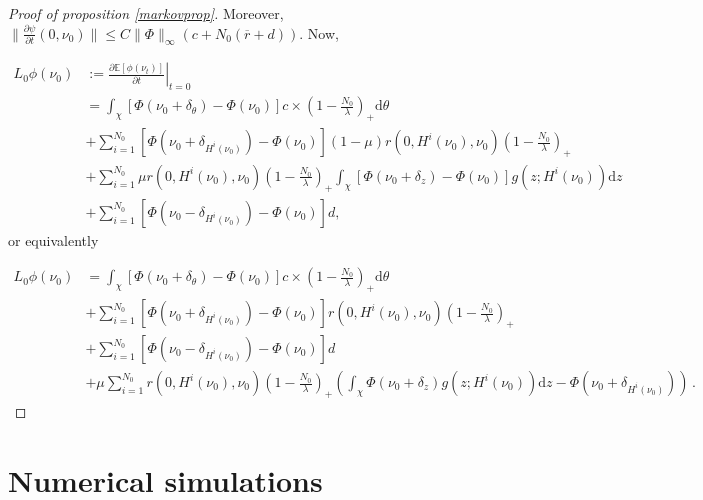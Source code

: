 \documentclass[a4paper,11pt]{article}
\newcommand{\dx}{\textrm{d}}
\begin{document}
\begin{proof}[Proof of proposition \ref{markovprop}]
Moreover, $\parallel \frac{\partial \psi}{\partial t}(0,\nu_0) \parallel \leq C \parallel \Phi \parallel_{\infty}(c+ N_0 (\overline{r}+d))$. Now,

\begin{displaymath}
\begin{aligned}
L_0\phi(\nu_0) &:= \left. \frac{\partial \mathbb{E}\left[\phi(\nu_t)\right]}{\partial t}\right\vert_{t=0} \\
&= \int_{\chi} \left[ \Phi(\nu_{0} + \delta_{\theta}) -\Phi(\nu_{0} )  \right] c\times (1-\frac{N_{0}}{\lambda})_+ \dx \theta \\
&+ \sum_{i=1}^{N_{0}}
 \left[ \Phi(\nu_{0} + \delta_{H^i(\nu_{0})}) -\Phi(\nu_{0})   \right]  (1-\mu) r(0,H^i(\nu_{0}),\nu_{0})(1-\frac{N_{0}}{\lambda})_+  \\
 & +  \sum_{i=1}^{N_{0}} \mu r(0,H^i(\nu_{0}),\nu_{0})(1-\frac{N_{0}}{\lambda})_+
\int_{\chi } \left[ \Phi(\nu_{0} + \delta_{z}) -\Phi(\nu_{0})   \right] g( z; H^i(\nu_{0}))  \dx z
\\
& +  \sum_{i=1}^{N_{0}} \left[ \Phi(\nu_{0} - \delta_{H^i(\nu_{0})}) -\Phi(\nu_{0})   \right] d,
\end{aligned}
\end{displaymath}
or equivalently 

\begin{displaymath}
\begin{aligned}
L_0\phi(\nu_0) &= \int_{\chi} \left[ \Phi(\nu_{0} + \delta_{\theta}) -\Phi(\nu_{0})  \right] c\times (1-\frac{N_{0}}{\lambda})_+ \dx \theta \\
&+ \sum_{i=1}^{N_{0}}
 \left[ \Phi(\nu_{0} + \delta_{H^i(\nu_{0})}) -\Phi(\nu_{0})   \right]  r(0,H^i(\nu_{0}),\nu_{0}) (1-\frac{N_{0}}{\lambda})_+ \\
 & +  \sum_{i=1}^{N_{0}} \left[ \Phi(\nu_{0} - \delta_{H^i(\nu_{0})}) -\Phi(\nu_{0})  \right] d\\
 &+ \mu \sum_{i=1}^{N_{0}} r(0,H^i(\nu_{0}),\nu_{0})(1-\frac{N_{0}}{\lambda})_+ \left( \int_{\chi } \Phi(\nu_{0} + \delta_{z}) g( z; H^i(\nu_{0}))  \dx z - \Phi(\nu_{0} + \delta_{H^i(\nu_{0})}) \right) \,.
 \end{aligned}
\end{displaymath}
\end{proof}


\section{Numerical simulations}
\end{document}
